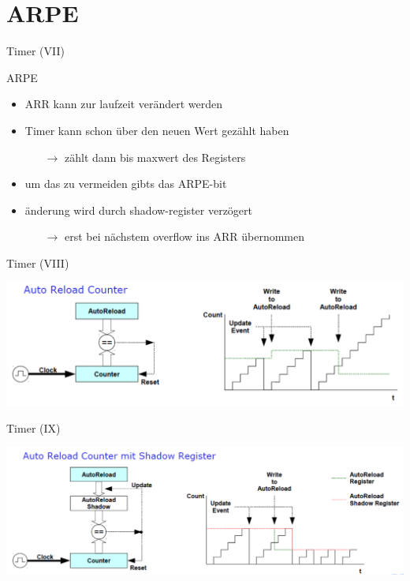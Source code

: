   \section{ARPE}
  \begin{frame}{Timer (VII)}
    \begin{block} {ARPE}
      \begin{itemize}
        \item ARR kann zur laufzeit verändert werden
        \item Timer kann schon über den neuen Wert gezählt haben
        \begin{itemize}
          \item[$\rightarrow$] zählt dann bis maxwert des Registers
        \end{itemize}
        \item um das zu vermeiden gibts das ARPE-bit
        \item änderung wird durch shadow-register verzögert
        \begin{itemize}
          \item[$\rightarrow$] erst bei nächstem overflow ins ARR übernommen
        \end{itemize}
      \end{itemize}
    \end{block}
  \end{frame}

  \begin{frame}{Timer (VIII)}
    \begin{center}
      \includegraphics[width=\textwidth]{figs/ARPE_disable}    
    \end{center}
  \end{frame}

  \begin{frame}{Timer (IX)}
    \begin{center}
      \includegraphics[width=\textwidth]{figs/ARPE_enable}    
    \end{center}
  \end{frame}

